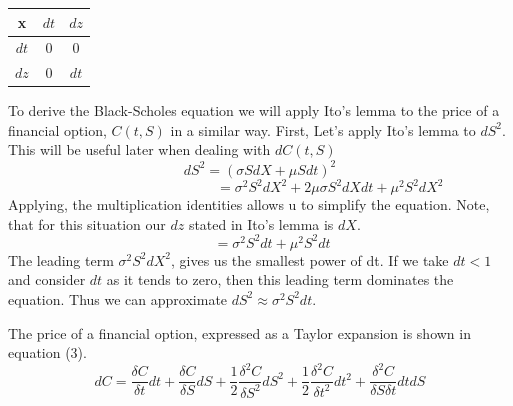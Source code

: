 \documentclass[11pt]{article}
\begin{document}
\begin{center}
\begin{tabular}{  c|  c  c}
x & $dt$ & $dz$ \\
\hline
$dt$ & 0 & 0  \\ 
$dz$ & 0 & $dt$  \\ 
\end{tabular}
\end{center}

To derive the Black-Scholes equation we will apply Ito's lemma to the price of a financial option, $C(t,S)$ in a similar way. First, Let's apply Ito's lemma to $dS^2$. This will be useful later when dealing with $dC(t,S)$
\begin{equation*}
dS^2 = (\sigma S dX + \mu S dt)^2
\end{equation*}
\vspace{-10pt}
\begin{equation*}
\phantom{ccccccccccccccccccccccc}
= \sigma ^2 S^2 dX^2 + 2\mu \sigma S^2 dXdt + \mu ^2 S^2 dX^2
\end{equation*}
Applying, the multiplication identities allows u to simplify the equation. Note, that for this situation our $dz$ stated in Ito's lemma is $dX$.
\vspace{-5pt}
\begin{equation*}
\phantom{cccccccccccccccccc}
= \sigma ^2 S^2 dt + \mu ^2 S^2 dt\phantom{cccccccccccccc}
\end{equation*}
 The leading term $\sigma ^2 S^2 dX^2$, gives us the smallest power of dt. If we take $dt <1$ and consider $dt$ as it tends to zero, then this leading term dominates the equation. Thus we can approximate $dS^2 \approx \sigma ^2 S^2 dt$.


The price of a financial option,
expressed as a Taylor expansion is shown in equation (3).
\\
\begin{equation}
dC = \frac{\delta C}{\delta t}dt + \frac{\delta C}{\delta S}dS + \frac{1}{2}\frac{\delta^2 C}{\delta S^2}dS^2
+\frac{1}{2}\frac{\delta^2 C}{\delta t^2}dt^2 + \frac{\delta^2 C}{\delta S \delta t}dtdS
\end{equation}
\end{document}
